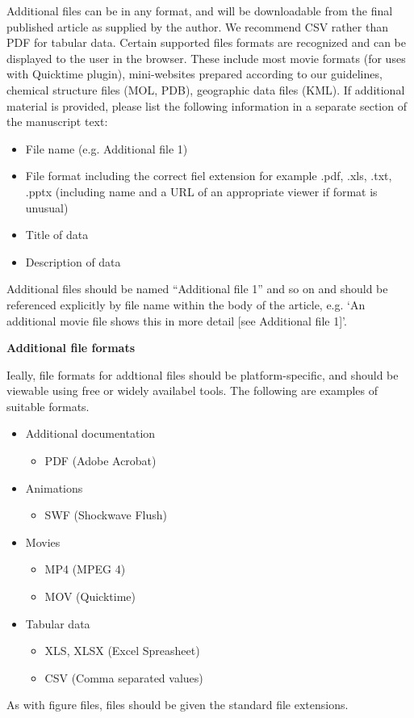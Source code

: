 \documentclass{EPS}
\begin{document}
Additional files can be in any format,
and will be downloadable from the final published article
as supplied by the author.
We recommend CSV rather than PDF for tabular data.
Certain supported files formats are recognized and
can be displayed to the user in the browser.
These include most movie formats
(for uses with Quicktime plugin),
mini-websites prepared according to our guidelines,
chemical structure files (MOL, PDB), geographic data files (KML).
If additional material is provided, please list the following
information in a separate section of the manuscript text:
\begin{itemize}
\item File name (e.g. Additional file 1)
\item File format including the correct fiel extension
for example .pdf, .xls, .txt, .pptx
(including name and a URL of an appropriate viewer if format is unusual)
\item Title of data
\item Description of data
\end{itemize}
Additional files should be named ``Additional file 1'' and so on
and should be referenced explicitly by file name within
the body of the article, e.g. `An additional movie file
shows this in more detail [see Additional file 1]'.

\noindent
\textbf{Additional file formats}

Ieally, file formats for addtional files should be platform-specific,
and should be viewable using free or widely availabel tools.
The following are examples of suitable formats.
\begin{itemize}
\item Additional documentation
  \begin{itemize}
    \item PDF (Adobe Acrobat)
  \end{itemize}
\item Animations
  \begin{itemize}
    \item SWF (Shockwave Flush)
  \end{itemize}
\item Movies
  \begin{itemize}
    \item MP4 (MPEG 4)
    \item MOV (Quicktime)
  \end{itemize}
\item Tabular data
  \begin{itemize}
    \item XLS, XLSX (Excel Spreasheet)
    \item CSV (Comma separated values)
  \end{itemize}
\end{itemize}
As with figure files, files should be given the standard file extensions.
\end{document}
